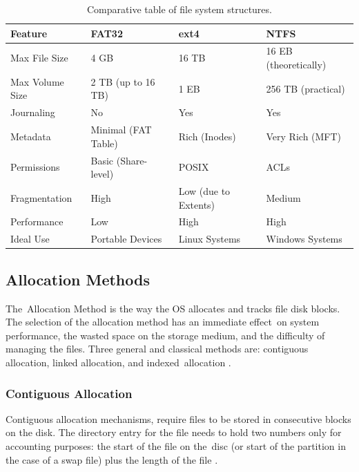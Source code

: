 \documentclass[12pt]{article}
\begin{document}
 \begin{table}[H]
     \centering
     \caption{Comparative table of file system structures.}
     \label{tab:fs_comparison}
     \begin{tabular}{@{}llll@{}}
         \toprule
         \textbf{Feature} & \textbf{FAT32} & \textbf{ext4} & \textbf{NTFS} \\ 
         \midrule
         Max File Size     & 4 GB                  & 16 TB                 & 16 EB (theoretically) \\
         Max Volume Size   & 2 TB (up to 16 TB)    & 1 EB                  & 256 TB (practical)    \\
         Journaling        & No                  & Yes                 & Yes                 \\
         Metadata          & Minimal (FAT Table)   & Rich (Inodes)         & Very Rich (MFT)       \\
         Permissions       & Basic (Share-level)   & POSIX                 & ACLs                  \\
         Fragmentation     & High                  & Low (due to Extents)  & Medium                \\
         Performance       & Low                   & High                  & High                  \\
         Ideal Use         & Portable Devices      & Linux Systems         & Windows Systems       \\ 
         \bottomrule
     \end{tabular}
 \end{table}




\subsection{Allocation Methods}
The Allocation Method is the way the OS allocates and tracks file disk blocks. The selection of the allocation method has an immediate effect on system performance, the wasted space on the storage medium, and the difficulty of managing the files. Three general and classical methods are: contiguous allocation, linked allocation, and indexed allocation \parencite{Silberschatz2018}.

\subsubsection{Contiguous Allocation}
Contiguous allocation mechanisms, require files to be stored in consecutive blocks on the disk. The directory entry for the file needs to hold two numbers only for accounting purposes: the start of the file on the disc (or start of the partition in the case of a swap file) plus the length of the file \parencite{Tanenbaum2014}.
\end{document}
